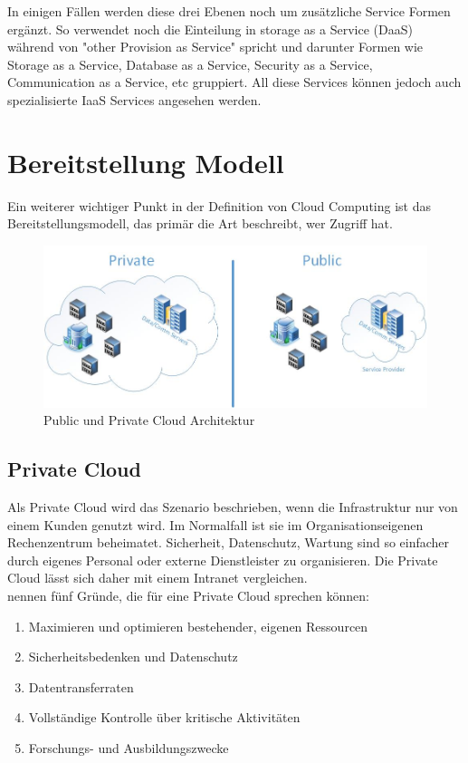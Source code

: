 In einigen Fällen werden diese drei Ebenen noch um zusätzliche Service Formen ergänzt. So verwendet \cite[S. 28]{Tharam.2010} noch die Einteilung in storage as a Service (DaaS) während \cite[S. 123]{Mahmood.2011} von "other Provision as Service" spricht und darunter Formen wie Storage as a Service, Database as a Service, Security as a Service, Communication as a Service, etc gruppiert. All diese Services können jedoch auch spezialisierte IaaS Services angesehen werden.


\section{Bereitstellung Modell}
Ein weiterer wichtiger Punkt in der Definition von Cloud Computing ist das Bereitstellungsmodell, das primär die Art beschreibt, wer Zugriff hat.

	\begin{figure}[h]
		\centering
		\includegraphics[width=0.9\linewidth]{images/private_public_cloud}
		\caption{Public und Private Cloud Architektur}
		\label{fig:PublicPrivateCloud}
	\end{figure}

\subsection{Private Cloud}
Als Private Cloud wird das Szenario beschrieben, wenn die Infrastruktur nur von einem Kunden genutzt wird. Im Normalfall ist sie im Organisationseigenen Rechenzentrum beheimatet. Sicherheit, Datenschutz, Wartung sind so einfacher durch eigenes Personal oder externe Dienstleister zu organisieren. Die Private Cloud lässt sich daher mit einem Intranet vergleichen. \cite[S. 879]{Jadeja.2012} \\
\cite{Tharam.2010} nennen fünf Gründe, die für eine Private Cloud sprechen können:
\begin{enumerate}
\item Maximieren und optimieren bestehender, eigenen Ressourcen
\item Sicherheitsbedenken und Datenschutz
\item Datentransferraten
\item Vollständige Kontrolle über kritische Aktivitäten
\item Forschungs- und Ausbildungszwecke
\end{enumerate}

